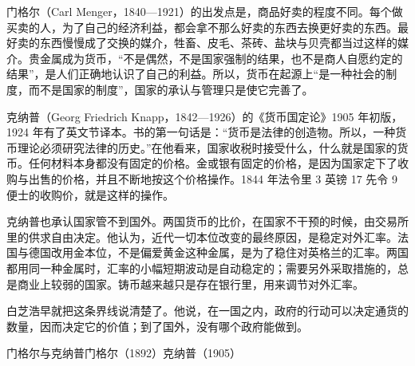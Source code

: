 门格尔（Carl Menger，1840—1921）的出发点是，商品好卖的程度不同。每个做买卖的人，为了自己的经济利益，都会拿不那么好卖的东西去换更好卖的东西\cite{menger1892}。最好卖的东西慢慢成了交换的媒介，牲畜、皮毛、茶砖、盐块与贝壳都当过这样的媒介\cite{menger1892}。贵金属成为货币，“不是偶然，不是国家强制的结果，也不是商人自愿约定的结果”，是人们正确地认识了自己的利益\cite{menger1892}。所以，货币在起源上“是一种社会的制度，而不是国家的制度”，国家的承认与管理只是使它完善了\cite{menger1892}。

克纳普（Georg Friedrich Knapp，1842—1926）的《货币国定论》1905 年初版，1924 年有了英文节译本\cite{knapp1924}。书的第一句话是：“货币是法律的创造物。所以，一种货币理论必须研究法律的历史。”\cite{knapp1924}在他看来，国家收税时接受什么，什么就是国家的货币\cite{knapp1924}。任何材料本身都没有固定的价格\cite{knapp1924}。金或银有固定的价格，是因为国家定下了收购与出售的价格，并且不断地按这个价格操作\cite{knapp1924}。1844 年法令里 3 英镑 17 先令 9 便士的收购价，就是这样的操作。

克纳普也承认国家管不到国外。两国货币的比价，在国家不干预的时候，由交易所里的供求自由决定\cite{knapp1924}。他认为，近代一切本位改变的最终原因，是稳定对外汇率\cite{knapp1924}。法国与德国改用金本位，不是偏爱黄金这种金属，是为了稳住对英格兰的汇率\cite{knapp1924}。两国都用同一种金属时，汇率的小幅短期波动是自动稳定的；需要另外采取措施的，总是商业上较弱的国家\cite{knapp1924}。铸币越来越只是存在银行里，用来调节对外汇率\cite{knapp1924}。

白芝浩早就把这条界线说清楚了。他说，在一国之内，政府的行动可以决定通货的数量，因而决定它的价值；到了国外，没有哪个政府能做到\cite{bagehot1873}。

\begin{compare}{门格尔与克纳普}{门格尔（1892）}{克纳普（1905）}
\end{compare}

